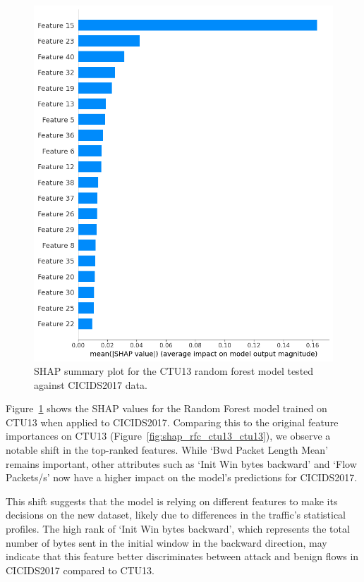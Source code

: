 \begin{figure}[H]
\centering
\includegraphics[width=\textwidth]{img/SHAP_RFCTU13_CICIDS2017.png}
\caption{SHAP summary plot for the CTU13 random forest model tested against CICIDS2017 data.}\label{fig:shap_rfc_ctu13_cicids2017}
\end{figure}

Figure~\ref{fig:shap_rfc_ctu13_cicids2017} shows the SHAP values for the Random Forest model trained on CTU13 when applied to CICIDS2017. Comparing this to the original feature importances on CTU13 (Figure~\ref{fig:shap_rfc_ctu13_ctu13}), we observe a notable shift in the top-ranked features. While `Bwd Packet Length Mean' remains important, other attributes such as `Init Win bytes backward' and `Flow Packets/s' now have a higher impact on the model's predictions for CICIDS2017.

This shift suggests that the model is relying on different features to make its decisions on the new dataset, likely due to differences in the traffic's statistical profiles. The high rank of `Init Win bytes backward', which represents the total number of bytes sent in the initial window in the backward direction, may indicate that this feature better discriminates between attack and benign flows in CICIDS2017 compared to CTU13.

